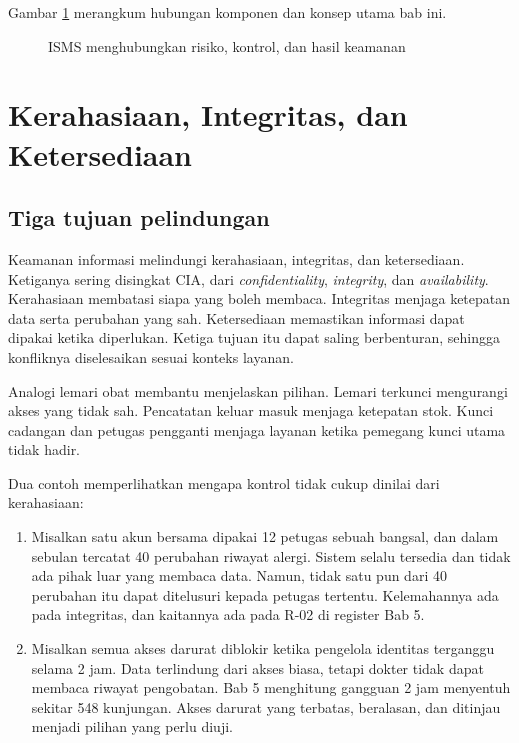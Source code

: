 Gambar \ref{fig:ch06-ilustrasi-bab} merangkum hubungan komponen dan konsep utama bab ini.
\begin{figure}[!htb]
  \centering
  
  \caption{ISMS menghubungkan risiko, kontrol, dan hasil keamanan}
  \label{fig:ch06-ilustrasi-bab}
\end{figure}

\section{Kerahasiaan, Integritas, dan Ketersediaan}

\subsection*{Tiga tujuan pelindungan}

Keamanan informasi melindungi kerahasiaan, integritas, dan ketersediaan. Ketiganya sering disingkat
CIA, dari \textit{confidentiality}, \textit{integrity}, dan \textit{availability}. Kerahasiaan
membatasi siapa yang boleh membaca. Integritas menjaga ketepatan data serta perubahan yang sah.
Ketersediaan memastikan informasi dapat dipakai ketika diperlukan. Ketiga tujuan itu dapat saling
berbenturan, sehingga konfliknya diselesaikan sesuai konteks layanan.

Analogi lemari obat membantu menjelaskan pilihan. Lemari terkunci mengurangi akses yang tidak sah.
Pencatatan keluar masuk menjaga ketepatan stok. Kunci cadangan dan petugas pengganti menjaga
layanan ketika pemegang kunci utama tidak hadir.

Dua contoh memperlihatkan mengapa kontrol tidak cukup dinilai dari kerahasiaan:
\begin{enumerate}
  \item Misalkan satu akun bersama dipakai 12 petugas sebuah bangsal, dan dalam sebulan tercatat
  40 perubahan riwayat alergi. Sistem selalu tersedia dan tidak ada pihak luar yang membaca data.
  Namun, tidak satu pun dari 40 perubahan itu dapat ditelusuri kepada petugas tertentu.
  Kelemahannya ada pada integritas, dan kaitannya ada pada R-02 di register Bab 5.
  \item Misalkan semua akses darurat diblokir ketika pengelola identitas terganggu selama 2 jam.
  Data terlindung dari akses biasa, tetapi dokter tidak dapat membaca riwayat pengobatan. Bab 5
  menghitung gangguan 2 jam menyentuh sekitar 548 kunjungan. Akses darurat yang terbatas,
  beralasan, dan ditinjau menjadi pilihan yang perlu diuji.
\end{enumerate}

